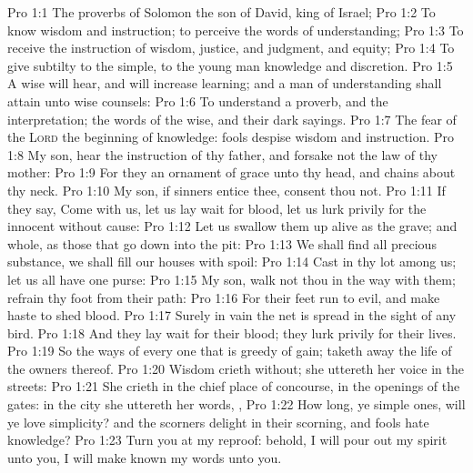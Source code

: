 \vs Pro 1:1 The proverbs of Solomon the son of David, king of Israel;
\vs Pro 1:2 To know wisdom and instruction; to perceive the words of understanding;
\vs Pro 1:3 To receive the instruction of wisdom, justice, and judgment, and equity;
\vs Pro 1:4 To give subtilty to the simple, to the young man knowledge and discretion.
\vs Pro 1:5 A wise  will hear, and will increase learning; and a man of understanding shall attain unto wise counsels:
\vs Pro 1:6 To understand a proverb, and the interpretation; the words of the wise, and their dark sayings.
\vs Pro 1:7 The fear of the \textsc{Lord}  the beginning of knowledge:  fools despise wisdom and instruction.
\vs Pro 1:8 My son, hear the instruction of thy father, and forsake not the law of thy mother:
\vs Pro 1:9 For they  an ornament of grace unto thy head, and chains about thy neck.
\vs Pro 1:10 My son, if sinners entice thee, consent thou not.
\vs Pro 1:11 If they say, Come with us, let us lay wait for blood, let us lurk privily for the innocent without cause:
\vs Pro 1:12 Let us swallow them up alive as the grave; and whole, as those that go down into the pit:
\vs Pro 1:13 We shall find all precious substance, we shall fill our houses with spoil:
\vs Pro 1:14 Cast in thy lot among us; let us all have one purse:
\vs Pro 1:15 My son, walk not thou in the way with them; refrain thy foot from their path:
\vs Pro 1:16 For their feet run to evil, and make haste to shed blood.
\vs Pro 1:17 Surely in vain the net is spread in the sight of any bird.
\vs Pro 1:18 And they lay wait for their  blood; they lurk privily for their  lives.
\vs Pro 1:19 So  the ways of every one that is greedy of gain;  taketh away the life of the owners thereof.
\vs Pro 1:20 Wisdom crieth without; she uttereth her voice in the streets:
\vs Pro 1:21 She crieth in the chief place of concourse, in the openings of the gates: in the city she uttereth her words, ,
\vs Pro 1:22 How long, ye simple ones, will ye love simplicity? and the scorners delight in their scorning, and fools hate knowledge?
\vs Pro 1:23 Turn you at my reproof: behold, I will pour out my spirit unto you, I will make known my words unto you.
